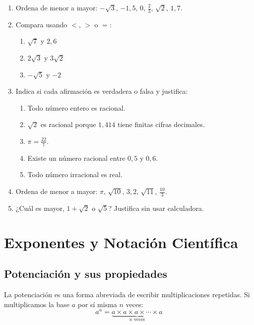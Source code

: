 \documentclass[12pt, letterpaper]{article}
\begin{document}
\begin{enumerate}[leftmargin=*, resume]
  \item \medio{} Ordena de menor a mayor: $-\sqrt{3}$, $-1{,}5$, $0$, $\frac{2}{3}$, $\sqrt{2}$, $1{,}7$.

  \item \medio{} Compara usando $<$, $>$ o $=$:
        \begin{enumerate}[label=\alph*)]
          \item $\sqrt{7}$ y $2{,}6$
          \item $2\sqrt{3}$ y $3\sqrt{2}$
          \item $-\sqrt{5}$ y $-2$
        \end{enumerate}

  \item \medio{} Indica si cada afirmación es verdadera o falsa y justifica:
        \begin{enumerate}[label=\alph*)]
          \item Todo número entero es racional.
          \item $\sqrt{2}$ es racional porque $1{,}414$ tiene finitas cifras decimales.
          \item $\pi = \frac{22}{7}$.
          \item Existe un número racional entre $0{,}5$ y $0{,}6$.
          \item Todo número irracional es real.
        \end{enumerate}

  \item \dificil{} Ordena de menor a mayor: $\pi$, $\sqrt{10}$, $3{,}2$, $\sqrt{11}$, $\frac{10}{3}$.

  \item \dificil{} ¿Cuál es mayor, $1 + \sqrt{2}$ o $\sqrt{5}$? Justifica sin usar calculadora.
\end{enumerate}

\section{Exponentes y Notación Científica}

\subsection{Potenciación y sus propiedades}

La potenciación es una forma abreviada de escribir multiplicaciones repetidas. Si multiplicamos la base $a$ por sí misma $n$ veces:
$$a^n = \underbrace{a \times a \times a \times \cdots \times a}_{n \text{ veces}}$$
\end{document}
